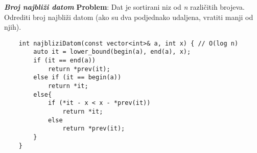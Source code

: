 \documentclass{article}
\begin{document}
\vspace{0.1cm}
\textit{\textbf{Broj najbliži datom}}
\vspace{0.1cm}\newline
\textbf{Problem}: Dat je sortirani niz od \textit{n} različitih brojeva. Odrediti broj najbliži
datom (ako su dva podjednako udaljena, vratiti manji od njih).
\begin{lstlisting}
    int najbliziDatom(const vector<int>& a, int x) { // O(log n)
        auto it = lower_bound(begin(a), end(a), x);
        if (it == end(a))
            return *prev(it);
        else if (it == begin(a))
            return *it;
        else{
            if (*it - x < x - *prev(it))
                return *it;
            else
                return *prev(it);
        }
    }
\end{lstlisting}
\end{document}
